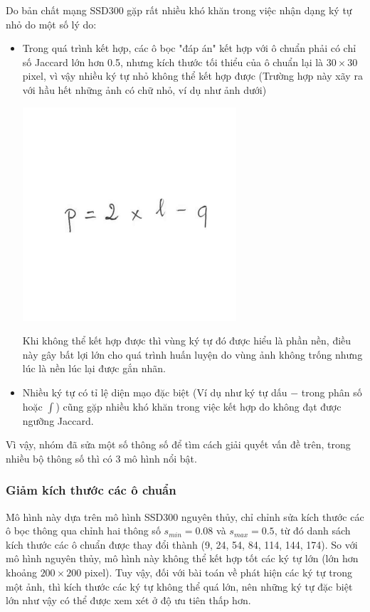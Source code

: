 \documentclass[a4paper,12pt]{article}
\begin{document}
	Do bản chất mạng SSD300 gặp rất nhiều khó khăn trong việc nhận dạng ký tự nhỏ do một số lý do:
	\begin{itemize}
		\item Trong quá trình kết hợp, các ô bọc "đáp án" kết hợp với ô chuẩn phải có chỉ số Jaccard lớn hơn 0.5, nhưng kích thước tối thiểu của ô chuẩn lại là $30 \times 30$ pixel, vì vậy nhiều ký tự nhỏ không thể kết hợp được (Trường hợp này xãy ra với hầu hết những ảnh có chữ nhỏ, ví dụ như ảnh dưới)
		\begin{center}
			\centering
			\includegraphics[resolution=300]{HMER_2017_TEST1_MINH_01_2A.png}
			\vspace{0.5cm}
		\end{center}
		Khi không thể kết hợp được thì vùng ký tự đó được hiểu là phần nền, điều này gây bất lợi lớn cho quá trình huấn luyện do vùng ảnh không trống nhưng lúc là nền lúc lại được gắn nhãn.
			
		\item Nhiều ký tự có tỉ lệ diện mạo đặc biệt (Ví dụ như ký tự dấu $-$ trong phân số hoặc $\int$) cũng gặp nhiều khó khăn trong việc kết hợp do không đạt được ngưỡng Jaccard.
	\end{itemize}
	
	Vì vậy, nhóm đã sửa một số thông số để tìm cách giải quyết vấn đề trên, trong nhiều bộ thông số thì có 3 mô hình nổi bật.
	
	\subsubsection*{Giảm kích thước các ô chuẩn}
	
	Mô hình này dựa trên mô hình SSD300 nguyên thủy, chỉ chỉnh sửa kích thước các ô bọc thông qua chỉnh hai thông số $s_{min} = 0.08$ và $s_{max} = 0.5$, từ đó danh sách kích thước các ô chuẩn được thay đổi thành (9, 24, 54, 84, 114, 144, 174). So với mô hình nguyên thủy, mô hình này không thể kết hợp tốt các ký tự lớn (lớn hơn khoảng $200 \times 200$ pixel). Tuy vậy, đối với bài toán về phát hiện các ký tự trong một ảnh, thì kích thước các ký tự không thể quá lớn, nên những ký tự đặc biệt lớn như vậy có thể được xem xét ở độ ưu tiên thấp hơn.\\
	
\end{document}
